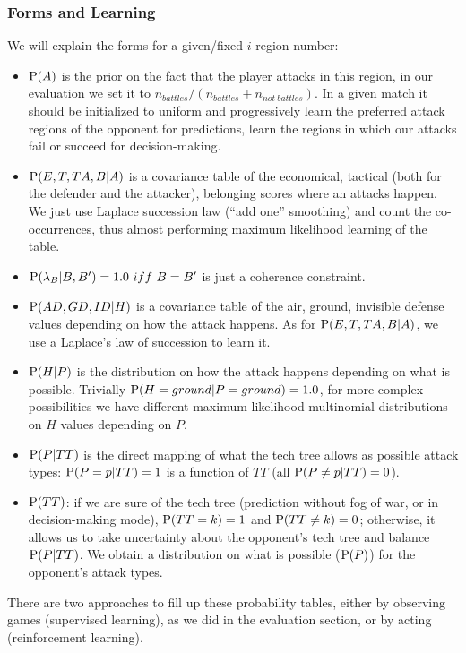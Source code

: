 \subsubsection{Forms and Learning}
We will explain the forms for a given/fixed $i$ region number:
\begin{itemize}
\item $\mathrm{P}(A)$ is the prior on the fact that the player attacks in this region, in our evaluation we set it to $n_{battles}/(n_{battles}+n_{not\ battles})$. In a given match it should be initialized to uniform and progressively learn the preferred attack regions of the opponent for predictions, learn the regions in which our attacks fail or succeed for decision-making.
\item $\mathrm{P}(E,T,TA,B|A)$ is a covariance table of the economical, tactical (both for the defender and the attacker), belonging scores where an attacks happen. We just use Laplace succession law (``add one'' smoothing) \cite{Jaynes} and count the co-occurrences, thus almost performing maximum likelihood learning of the table.
\item $\PP(\lambda_{B}|B,B') = 1.0\ iff\ B=B'$ is just a coherence constraint.
\item $\mathrm{P}(AD,GD,ID|H)$ is a covariance table of the air, ground, invisible defense values depending on how the attack happens. As for $\mathrm{P}(E,T,TA,B|A)$, we use a Laplace's law of succession to learn it.
\item $\mathrm{P}(H|P)$ is the distribution on how the attack happens depending on what is possible. Trivially $\mathrm{P}(H=ground|P=ground)=1.0$, for more complex possibilities we have different maximum likelihood multinomial distributions on $H$ values depending on $P$.
\item $\mathrm{P}(P|TT)$ is the direct mapping of what the tech tree allows as possible attack types: $\mathrm{P}(P=p|TT)=1$ is a function of $TT$ (all $\mathrm{P}(P\neq p|TT)=0$).
\item $\mathrm{P}(TT)$: if we are sure of the tech tree (prediction without fog of war, or in decision-making mode), $\mathrm{P}(TT=k)=1$ and $\mathrm{P}(TT\neq k)=0$; otherwise, it allows us to take uncertainty about the opponent's tech tree and balance $\mathrm{P}(P|TT)$. We obtain a distribution on what is possible ($\mathrm{P}(P)$) for the opponent's attack types.
\end{itemize}
There are two approaches to fill up these probability tables, either by observing games (supervised learning), as we did in the evaluation section, or by acting (reinforcement learning). %
